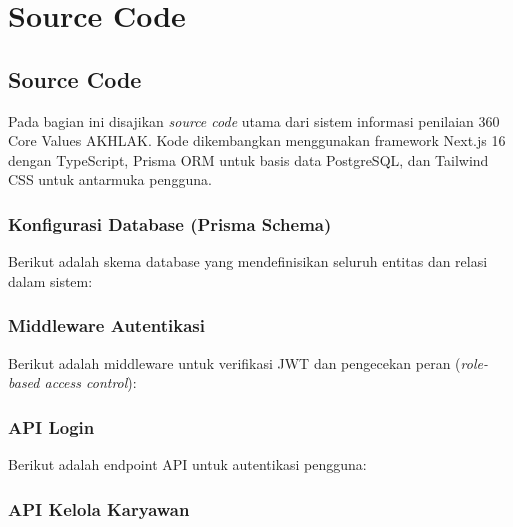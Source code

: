 \documentclass[12pt,a4paper,oneside]{report}
\begin{document}
\chapter{Source Code}

\section{Source Code}

Pada bagian ini disajikan \textit{source code} utama dari sistem informasi penilaian 360\textdegree{} Core Values AKHLAK. Kode dikembangkan menggunakan framework Next.js 16 dengan TypeScript, Prisma ORM untuk basis data PostgreSQL, dan Tailwind CSS untuk antarmuka pengguna.

\subsection{Konfigurasi Database (Prisma Schema)}

Berikut adalah skema database yang mendefinisikan seluruh entitas dan relasi dalam sistem:



\subsection{Middleware Autentikasi}

Berikut adalah middleware untuk verifikasi JWT dan pengecekan peran (\textit{role-based access control}):



\subsection{API Login}

Berikut adalah endpoint API untuk autentikasi pengguna:



\subsection{API Kelola Karyawan}
\end{document}

